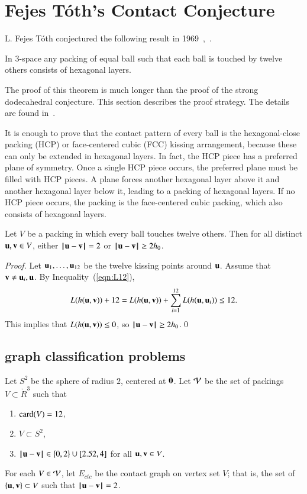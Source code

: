 \documentclass{llncs}
\begin{document}
\section{Fejes T\'oth's Contact Conjecture}


L. Fejes T\'oth conjectured the following result in
1969~\cite{Fejes-Toth:69},~\cite{Fejes-Toth:89}. 

\begin{theorem}
  In $3$-space any packing of equal ball such that each ball is touched
  by twelve others consists of hexagonal layers.
\end{theorem}

The proof of this theorem is much longer than the proof of the strong
dodecahedral conjecture.  This section describes the proof strategy.
The details are found in~\cite{DSP}.

It is enough to prove that the contact pattern of every ball is the
hexagonal-close packing (HCP) or face-centered cubic (FCC) kissing
arrangement, because these can only be extended in hexagonal layers.
In fact, the HCP piece has a preferred plane of symmetry.  Once a
single HCP piece occurs, the preferred plane must be filled with
HCP pieces.  A plane forces another hexagonal layer above it and another
hexagonal layer below it, leading to a packing of hexagonal layers.
If no HCP piece occurs, the packing is the face-centered cubic
packing, which also consists of hexagonal layers.

\begin{lemma} Let $V$ be a packing in which every ball touches twelve
  others.  Then for all distinct ${\mathbf u},{\mathbf v}\in V$, either
  $\norm{\u}{\v}=2$ or $\norm{\u}{\v}\ge 2h_0$.
\end{lemma}

\begin{proof}
Let $ {\mathbf u}_1,\ldots, {\mathbf u}_{12}$ be the twelve kissing points
  around ${\mathbf u}$.  Assume that ${\mathbf v}\ne {\mathbf u}_i,{\mathbf u}$.  By
  Inequality~(\ref{eqn:L12}),
\[
   L(h( {\mathbf u}, {\mathbf v}))  + 12 
  =  L(h( {\mathbf u}, {\mathbf v})) + \sum_{i=1}^{12} L(h( {\mathbf u}, {\mathbf u}_i))  \le 12.
\]
This implies that $L(h( {\mathbf u}, {\mathbf v}))\le 0$, so $\norm{ \u}{ \v}\ge 2h_0$.\qed
\end{proof}


\subsection{graph classification problems}

\begin{definition}
  Let $S^2$ be the sphere of radius $2$, centered at ${\mathbf 0}$.  Let
  ${\mathcal V}$ be the set of packings $V\subset \ring{R}^3$ such that
\begin{enumerate}
\item ${\operatorname{card}}(V) = 12$,
\item $V\subset S^2$,
\item $\norm{\u}{\v} \in \{0,2\}\cup
  \leftclosed2.52,4\rightclosed$ for all ${\mathbf u},{\mathbf v}\in V$.
\end{enumerate}
For each $V\in {\mathcal V}$, let $E_{ctc}$ be the contact graph on vertex set $V$;
that is, the set of $\{{\mathbf u},{\mathbf v}\}\subset V$ such that $\norm{\u}{\v}=2$.
\end{definition}
\end{document}
